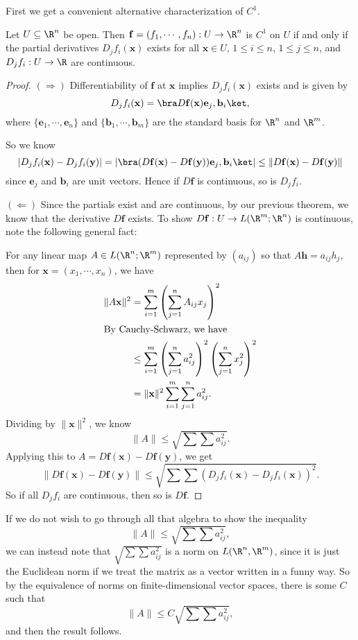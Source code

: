 \documentclass[a4paper]{article}
\begin{document}
First we get a convenient alternative characterization of $C^1$.
\begin{prop}
  Let $U \subseteq \R^n$ be open. Then $\mathbf{f} = (f_1, \cdots, f_n): U \to \R^n$ is $C^1$ on $U$ if and only if the partial derivatives $D_j f_i(\mathbf{x})$ exists for all $\mathbf{x} \in U$, $1 \leq i\leq n$, $1 \leq j \leq n$, and $D_j f_i: U \to \R$ are continuous.
\end{prop}

\begin{proof}
  $(\Rightarrow)$ Differentiability of $\mathbf{f}$ at $\mathbf{x}$ implies $D_j f_i(\mathbf{x})$ exists and is given by
  \[
    D_j f_i (\mathbf{x}) = \bra D\mathbf{f}(\mathbf{x}) \mathbf{e}_j, \mathbf{b}_i\ket,
  \]
  where $\{\mathbf{e}_1, \cdots, \mathbf{e}_n\}$ and $\{\mathbf{b}_1, \cdots, \mathbf{b}_m\}$ are the standard basis for $\R^n$ and $\R^m$.

  So we know
  \[
    |D_j f_i (\mathbf{x}) - D_j f_i (\mathbf{y})| = |\bra (D \mathbf{f}(\mathbf{x}) - D \mathbf{f}(\mathbf{y})) \mathbf{e}_j, \mathbf{b}_i \ket | \leq \|D \mathbf{f}(\mathbf{x}) - D \mathbf{f}(\mathbf{y})\|
  \]
  since $\mathbf{e}_j$ and $\mathbf{b}_i$ are unit vectors. Hence if $D\mathbf{f}$ is continuous, so is $D_j f_i$.

  $(\Leftarrow)$ Since the partials exist and are continuous, by our previous theorem, we know that the derivative $D \mathbf{f}$ exists. To show $D\mathbf{f}: U \to L(\R^m; \R^n)$ is continuous, note the following general fact:

  For any linear map $A \in L(\R^n; \R^m)$ represented by $(a_{ij})$ so that $A\mathbf{h} = a_{ij} h_j$, then for $\mathbf{x} = (x_1, \cdots, x_n)$, we have
  \begin{align*}
    \|A \mathbf{x}\|^2 &= \sum_{i = 1}^m \left(\sum_{j = 1}^n A_{ij} x_j\right)^2\\
    \intertext{By Cauchy-Schwarz, we have}
    &\leq \sum_{i = 1}^m \left(\sum_{j = 1}^n a_{ij}^2\right)^2 \left(\sum_{j = 1}^n x_j^2\right)^2\\
    &= \|\mathbf{x}\|^2 \sum_{i = 1}^m \sum_{j = 1}^n a_{ij}^2.
  \end{align*}
  Dividing by $\|\mathbf{x}\|^2$, we know
  \[
    \|A\| \leq \sqrt{\sum \sum a_{ij}^2}.
  \]
  Applying this to $A = D \mathbf{f}(\mathbf{x}) - D \mathbf{f}(\mathbf{y})$, we get
  \[
    \|D \mathbf{f}(\mathbf{x}) - D \mathbf{f}(\mathbf{y})\| \leq \sqrt{\sum\sum (D_j f_i(\mathbf{x}) - D_j f_i (\mathbf{x}))^2}.
  \]
  So if all $D_j f_i$ are continuous, then so is $D \mathbf{f}$.
\end{proof}
If we do not wish to go through all that algebra to show the inequality
\[
  \|A\| \leq \sqrt{\sum \sum a_{ij}^2},
\]
we can instead note that $\sqrt{\sum \sum a_{ij}^2}$ is a norm on $L(\R^n, \R^m)$, since it is just the Euclidean norm if we treat the matrix as a vector written in a funny way. So by the equivalence of norms on finite-dimensional vector spaces, there is some $C$ such that
\[
  \|A\| \leq C\sqrt{\sum \sum a_{ij}^2},
\]
and then the result follows.
\end{document}
